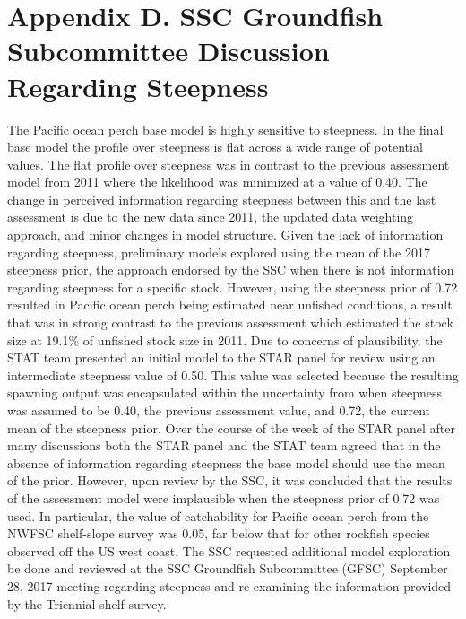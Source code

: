 \documentclass[12pt,]{article}
\begin{document}
\FloatBarrier

\newpage

\section{Appendix D. SSC Groundfish Subcommittee Discussion Regarding
Steepness}\label{appendix-d.-ssc-groundfish-subcommittee-discussion-regarding-steepness}

The Pacific ocean perch base model is highly sensitive to steepness. In
the final base model the profile over steepness is flat across a wide
range of potential values. The flat profile over steepness was in
contrast to the previous assessment model from 2011 where the likelihood
was minimized at a value of 0.40. The change in perceived information
regarding steepness between this and the last assessment is due to the
new data since 2011, the updated data weighting approach, and minor
changes in model structure. Given the lack of information regarding
steepness, preliminary models explored using the mean of the 2017
steepness prior, the approach endorsed by the SSC when there is not
information regarding steepness for a specific stock. However, using the
steepness prior of 0.72 resulted in Pacific ocean perch being estimated
near unfished conditions, a result that was in strong contrast to the
previous assessment which estimated the stock size at 19.1\% of unfished
stock size in 2011. Due to concerns of plausibility, the STAT team
presented an initial model to the STAR panel for review using an
intermediate steepness value of 0.50. This value was selected because
the resulting spawning output was encapsulated within the uncertainty
from when steepness was assumed to be 0.40, the previous assessment
value, and 0.72, the current mean of the steepness prior. Over the
course of the week of the STAR panel after many discussions both the
STAR panel and the STAT team agreed that in the absence of information
regarding steepness the base model should use the mean of the prior.
However, upon review by the SSC, it was concluded that the results of
the assessment model were implausible when the steepness prior of 0.72
was used. In particular, the value of catchability for Pacific ocean
perch from the NWFSC shelf-slope survey was 0.05, far below that for
other rockfish species observed off the US west coast. The SSC requested
additional model exploration be done and reviewed at the SSC Groundfish
Subcommittee (GFSC) September 28, 2017 meeting regarding steepness and
re-examining the information provided by the Triennial shelf survey.
\end{document}
